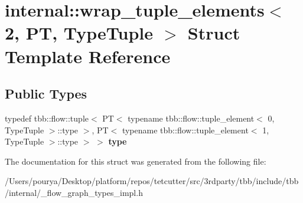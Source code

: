 \hypertarget{structinternal_1_1wrap__tuple__elements_3_012_00_01PT_00_01TypeTuple_01_4}{}\section{internal\+:\+:wrap\+\_\+tuple\+\_\+elements$<$ 2, P\+T, Type\+Tuple $>$ Struct Template Reference}
\label{structinternal_1_1wrap__tuple__elements_3_012_00_01PT_00_01TypeTuple_01_4}
\subsection*{Public Types}
\begin{DoxyCompactItemize}
\item 
\hypertarget{structinternal_1_1wrap__tuple__elements_3_012_00_01PT_00_01TypeTuple_01_4_a427b7d3fe2d36e66ff45175f004fcdec}{}typedef tbb\+::flow\+::tuple$<$ P\+T$<$ typename tbb\+::flow\+::tuple\+\_\+element$<$ 0, Type\+Tuple $>$\+::type $>$, P\+T$<$ typename tbb\+::flow\+::tuple\+\_\+element$<$ 1, Type\+Tuple $>$\+::type $>$ $>$ {\bfseries type}\label{structinternal_1_1wrap__tuple__elements_3_012_00_01PT_00_01TypeTuple_01_4_a427b7d3fe2d36e66ff45175f004fcdec}

\end{DoxyCompactItemize}


The documentation for this struct was generated from the following file\+:\begin{DoxyCompactItemize}
\item 
/\+Users/pourya/\+Desktop/platform/repos/tetcutter/src/3rdparty/tbb/include/tbb/internal/\+\_\+flow\+\_\+graph\+\_\+types\+\_\+impl.\+h\end{DoxyCompactItemize}
